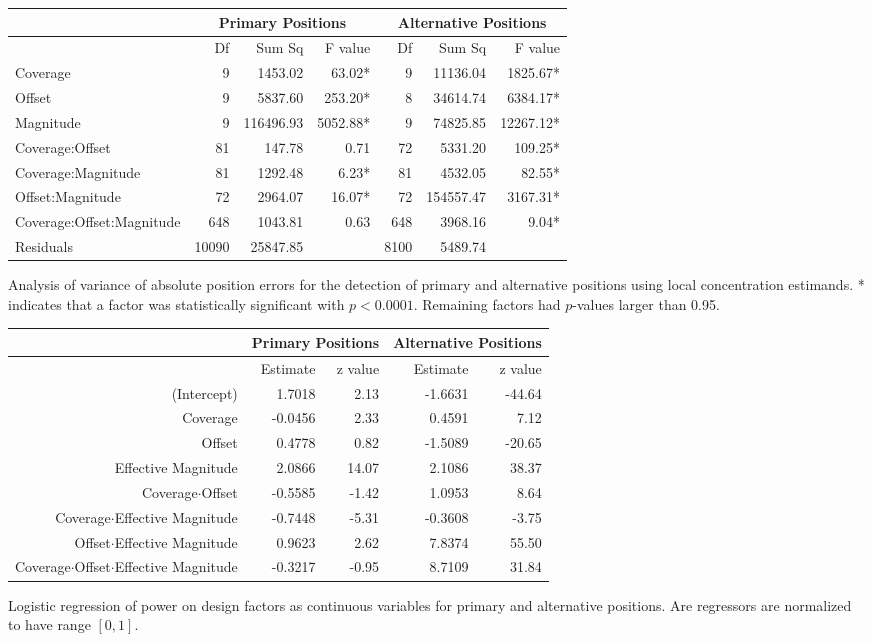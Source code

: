 \begin{FPtable}
\begin{sideways}
\begin{tabular}{l|rrr|rrr}
\hline 
 & \multicolumn{3}{c|}{Primary Positions} & \multicolumn{3}{c}{Alternative Positions}\tabularnewline
\hline 
 & Df  & Sum Sq  & F value  & Df  & Sum Sq  & F value \tabularnewline
\hline 
Coverage & 9  & 1453.02  & 63.02{*} & 9  & 11136.04  & 1825.67{*} \tabularnewline
Offset  & 9  & 5837.60  & 253.20{*}  & 8  & 34614.74  & 6384.17{*} \tabularnewline
Magnitude  & 9  & 116496.93  & 5052.88{*}  & 9  & 74825.85  & 12267.12{*} \tabularnewline
Coverage:Offset  & 81  & 147.78  & 0.71\phantom{*}  & 72  & 5331.20  & 109.25{*} \tabularnewline
Coverage:Magnitude  & 81  & 1292.48  & 6.23{*}  & 81  & 4532.05  & 82.55{*} \tabularnewline
Offset:Magnitude  & 72  & 2964.07  & 16.07{*} & 72  & 154557.47  & 3167.31{*} \tabularnewline
Coverage:Offset:Magnitude  & 648  & 1043.81  & 0.63\phantom{*}  & 648  & 3968.16  & 9.04{*} \tabularnewline
Residuals  & 10090  & 25847.85  &  & 8100  & 5489.74  & \tabularnewline
\hline 
\end{tabular}
\end{sideways}
\caption{Analysis of variance of absolute position errors for the detection
of primary and alternative positions using local concentration estimands.
{*} indicates that a factor was statistically significant with $p<0.0001$.
Remaining factors had $p$-values larger than 0.95.
\label{tab:detectionAnova}
\vspace{72pt}}
\end{FPtable}
\afterpage{\clearpage}

\begin{FPtable}
\begin{sideways}
\begin{tabular}{r|rr|rr}
\hline 
 & \multicolumn{2}{c|}{Primary Positions} & \multicolumn{2}{c}{Alternative Positions}\tabularnewline
\hline 
 & Estimate  & z value  & Estimate  & z value \tabularnewline
\hline 
(Intercept)  & 1.7018  & 2.13  & -1.6631  & -44.64 \tabularnewline
Coverage & -0.0456  & 2.33  & 0.4591  & 7.12 \tabularnewline
Offset  & 0.4778  & 0.82  & -1.5089  & -20.65 \tabularnewline
Effective Magnitude  & 2.0866  & 14.07  & 2.1086  & 38.37 \tabularnewline
Coverage$\cdot$Offset  & -0.5585  & -1.42  & 1.0953  & 8.64 \tabularnewline
Coverage$\cdot$Effective Magnitude  & -0.7448  & -5.31  & -0.3608  & -3.75 \tabularnewline
Offset$\cdot$Effective Magnitude  & 0.9623  & 2.62  & 7.8374  & 55.50 \tabularnewline
Coverage$\cdot$Offset$\cdot$Effective Magnitude  & -0.3217  & -0.95  & 8.7109  & 31.84 \tabularnewline
\hline 
\end{tabular}
\end{sideways}
\caption{Logistic regression of power on design factors as continuous variables
for primary and alternative positions. Are regressors are normalized
to have range $[0,1]$.
\label{tab:detectionGlm}
\vspace{72pt}}
\end{FPtable}
\afterpage{\clearpage}
\fi

